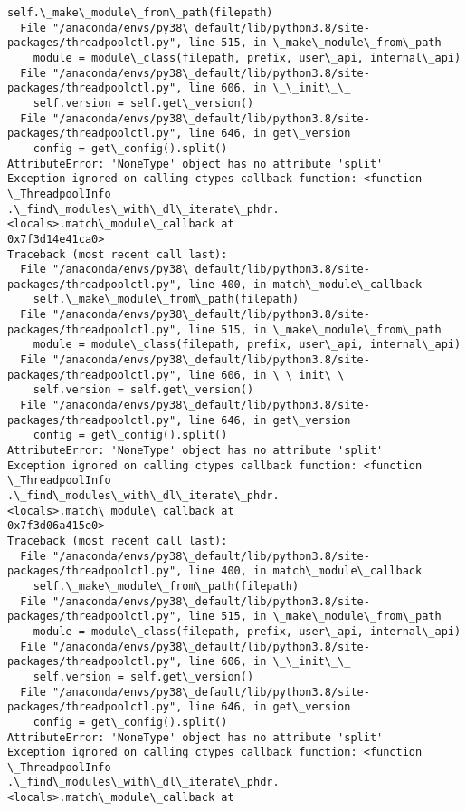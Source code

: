 \documentclass[11pt]{article}
\begin{document}
\begin{Verbatim}[commandchars=\\\{\}]
    self.\_make\_module\_from\_path(filepath)
  File "/anaconda/envs/py38\_default/lib/python3.8/site-
packages/threadpoolctl.py", line 515, in \_make\_module\_from\_path
    module = module\_class(filepath, prefix, user\_api, internal\_api)
  File "/anaconda/envs/py38\_default/lib/python3.8/site-
packages/threadpoolctl.py", line 606, in \_\_init\_\_
    self.version = self.get\_version()
  File "/anaconda/envs/py38\_default/lib/python3.8/site-
packages/threadpoolctl.py", line 646, in get\_version
    config = get\_config().split()
AttributeError: 'NoneType' object has no attribute 'split'
Exception ignored on calling ctypes callback function: <function \_ThreadpoolInfo
.\_find\_modules\_with\_dl\_iterate\_phdr.<locals>.match\_module\_callback at
0x7f3d14e41ca0>
Traceback (most recent call last):
  File "/anaconda/envs/py38\_default/lib/python3.8/site-
packages/threadpoolctl.py", line 400, in match\_module\_callback
    self.\_make\_module\_from\_path(filepath)
  File "/anaconda/envs/py38\_default/lib/python3.8/site-
packages/threadpoolctl.py", line 515, in \_make\_module\_from\_path
    module = module\_class(filepath, prefix, user\_api, internal\_api)
  File "/anaconda/envs/py38\_default/lib/python3.8/site-
packages/threadpoolctl.py", line 606, in \_\_init\_\_
    self.version = self.get\_version()
  File "/anaconda/envs/py38\_default/lib/python3.8/site-
packages/threadpoolctl.py", line 646, in get\_version
    config = get\_config().split()
AttributeError: 'NoneType' object has no attribute 'split'
Exception ignored on calling ctypes callback function: <function \_ThreadpoolInfo
.\_find\_modules\_with\_dl\_iterate\_phdr.<locals>.match\_module\_callback at
0x7f3d06a415e0>
Traceback (most recent call last):
  File "/anaconda/envs/py38\_default/lib/python3.8/site-
packages/threadpoolctl.py", line 400, in match\_module\_callback
    self.\_make\_module\_from\_path(filepath)
  File "/anaconda/envs/py38\_default/lib/python3.8/site-
packages/threadpoolctl.py", line 515, in \_make\_module\_from\_path
    module = module\_class(filepath, prefix, user\_api, internal\_api)
  File "/anaconda/envs/py38\_default/lib/python3.8/site-
packages/threadpoolctl.py", line 606, in \_\_init\_\_
    self.version = self.get\_version()
  File "/anaconda/envs/py38\_default/lib/python3.8/site-
packages/threadpoolctl.py", line 646, in get\_version
    config = get\_config().split()
AttributeError: 'NoneType' object has no attribute 'split'
Exception ignored on calling ctypes callback function: <function \_ThreadpoolInfo
.\_find\_modules\_with\_dl\_iterate\_phdr.<locals>.match\_module\_callback at

\end{Verbatim}
\end{document}
